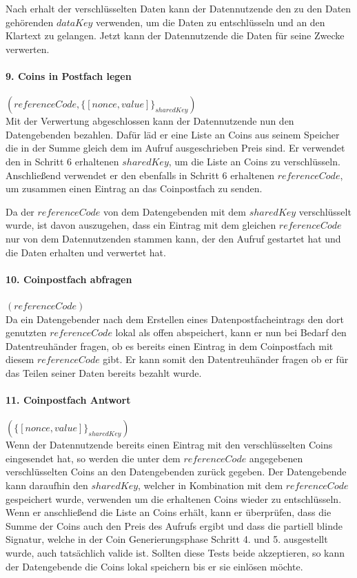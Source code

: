\documentclass[11pt,a4paper]{scrreprt}
\begin{document}
Nach erhalt der verschlüsselten Daten kann der Datennutzende den zu den Daten gehörenden $dataKey$ verwenden, um die Daten zu entschlüsseln und an den Klartext zu gelangen. Jetzt kann der Datennutzende die Daten für seine Zwecke verwerten.

\paragraph{9. Coins in Postfach legen} $(referenceCode, \{[nonce,value]\}_{sharedKey})$\\
\label{para:payment_9}
Mit der Verwertung abgeschlossen kann der Datennutzende nun den Datengebenden bezahlen. Dafür läd er eine Liste an Coins aus seinem Speicher die in der Summe gleich dem im Aufruf ausgeschrieben Preis sind. Er verwendet den in Schritt 6 erhaltenen $sharedKey$, um die Liste an Coins zu verschlüsseln. Anschließend verwendet er den ebenfalls in Schritt 6 erhaltenen $referenceCode$, um zusammen einen Eintrag an das Coinpostfach zu senden.

Da der $referenceCode$ von dem Datengebenden mit dem $sharedKey$ verschlüsselt wurde, ist davon auszugehen, dass ein Eintrag mit dem gleichen $referenceCode$ nur von dem Datennutzenden stammen kann, der den Aufruf gestartet hat und die Daten erhalten und verwertet hat.

\paragraph{10. Coinpostfach abfragen} $(referenceCode)$\\
Da ein Datengebender nach dem Erstellen eines Datenpostfacheintrags den dort genutzten $referenceCode$ lokal als offen abspeichert, kann er nun bei Bedarf den Datentreuhänder fragen, ob es bereits einen Eintrag in dem Coinpostfach mit diesem $referenceCode$ gibt. Er kann somit den Datentreuhänder fragen ob er für das Teilen seiner Daten bereits bezahlt wurde.

\paragraph{11. Coinpostfach Antwort} $(\{[nonce,value]\}_{sharedKey})$\\
Wenn der Datennutzende bereits einen Eintrag mit den verschlüsselten Coins eingesendet hat, so werden die unter dem $referenceCode$ angegebenen verschlüsselten Coins an den Datengebenden zurück gegeben. Der Datengebende kann daraufhin den $sharedKey$, welcher in Kombination mit dem $referenceCode$ gespeichert wurde, verwenden um die erhaltenen Coins wieder zu entschlüsseln. Wenn er anschließend die Liste an Coins erhält, kann er überprüfen, dass die Summe der Coins auch den Preis des Aufrufs ergibt und dass die partiell blinde Signatur, welche in der Coin Generierungsphase Schritt 4. und 5. ausgestellt wurde, auch tatsächlich valide ist. Sollten diese Tests beide akzeptieren, so kann der Datengebende die Coins lokal speichern bis er sie einlösen möchte.
\end{document}
